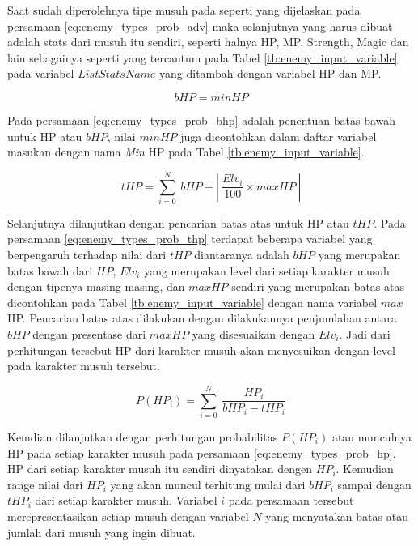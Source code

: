 Saat sudah diperolehnya tipe musuh pada seperti yang dijelaskan pada persamaan \ref{eq:enemy_types_prob_adv} maka selanjutnya yang harus dibuat adalah stats dari musuh itu sendiri, seperti halnya HP, MP, Strength, Magic dan lain sebagainya seperti yang tercantum pada Tabel \ref{tb:enemy_input_variable} pada variabel $List Stats Name$ yang ditambah dengan variabel HP dan MP.

\begin{equation}\label{eq:enemy_types_prob_bhp}
bHP = minHP
\end{equation}

Pada persamaan \ref{eq:enemy_types_prob_bhp} adalah penentuan batas bawah untuk HP atau $bHP$, nilai $minHP$ juga dicontohkan dalam daftar variabel masukan dengan nama \textit{Min} HP pada Tabel \ref{tb:enemy_input_variable}.

\begin{equation}\label{eq:enemy_types_prob_thp}
tHP = \sum_{i=0}^{N}\ bHP + \left |\ \frac{Elv_{i}}{100} \times maxHP\ \right |
\end{equation}

Selanjutnya dilanjutkan dengan pencarian batas atas untuk HP atau $tHP$. Pada persamaan \ref{eq:enemy_types_prob_thp} terdapat beberapa variabel yang berpengaruh terhadap nilai dari $tHP$ diantaranya adalah $bHP$ yang merupakan batas bawah dari $HP$, $Elv_{i}$ yang merupakan level dari setiap karakter musuh dengan tipenya masing-masing, dan $maxHP$ sendiri yang merupakan batas atas dicontohkan pada Tabel \ref{tb:enemy_input_variable} dengan nama variabel $max$ HP. Pencarian batas atas dilakukan dengan dilakukannya penjumlahan antara $bHP$ dengan presentase dari $maxHP$ yang disesuaikan dengan $Elv_{i}$. Jadi dari perhitungan tersebut HP dari karakter musuh akan menyesuikan dengan level pada karakter musuh tersebut. 

\begin{equation}\label{eq:enemy_types_prob_hp}
P(HP_{i}) = \sum_{i=0}^{N}\ \frac{HP_{i}}{bHP_{i} - tHP_{i}}
\end{equation}

Kemdian dilanjutkan dengan perhitungan probabilitas $P(HP_{i})$ atau munculnya HP pada setiap karakter musuh pada persamaan \ref{eq:enemy_types_prob_hp}. HP dari setiap karakter musuh itu sendiri dinyatakan dengen $HP_{i}$. Kemudian range nilai dari $HP_{i}$ yang akan muncul terhitung mulai dari $bHP_{i}$ sampai dengan $tHP_{i}$ dari setiap karakter musuh. Variabel $i$ pada persamaan tersebut merepresentasikan setiap musuh dengan variabel $N$ yang menyatakan batas atau jumlah dari musuh yang ingin dibuat.

